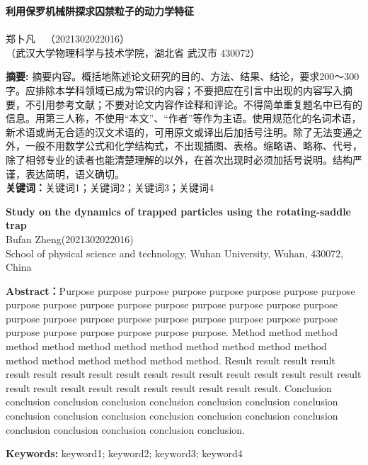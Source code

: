 \documentclass{WHUReport}
\newcommand{\name}{郑卜凡}
\newcommand{\stuid}{2021302022016}
\newcommand{\Name}{Bufan Zheng}
\newcommand{\newtitle}{利用保罗机械阱探求囚禁粒子的动力学特征}
\newcommand{\Title}{Study on the dynamics of trapped particles using the rotating-saddle trap}
\begin{document}
\pagestyle{maincontent} 


\begin{center}
 \textbf{\newtitle}\\
~\\
 \kaishu \name \ \ （\stuid）\\
 \kaishu （武汉大学物理科学与技术学院，湖北省 武汉市 430072）\\
\end{center}
\textbf{摘\quad 要:}
摘要内容。概括地陈述论文研究的目的、方法、结果、结论，要求200～300字。应排除本学科领域已成为常识的内容；不要把应在引言中出现的内容写入摘要，不引用参考文献；不要对论文内容作诠释和评论。不得简单重复题名中已有的信息。用第三人称，不使用“本文”、“作者”等作为主语。使用规范化的名词术语，新术语或尚无合适的汉文术语的，可用原文或译出后加括号注明。除了无法变通之外，一般不用数学公式和化学结构式，不出现插图、表格。缩略语、略称、代号，除了相邻专业的读者也能清楚理解的以外，在首次出现时必须加括号说明。结构严谨，表达简明，语义确切。\\
\textbf{关键词：}关键词1；关键词2；关键词3；关键词4
~\\
\begin{center}
	\textbf{\Title}\\
	 \Name\quad (\stuid)\\
	 School of physical science and technology, Wuhan University, Wuhan, 430072, China
\end{center}

\textbf{Abstract：}Purpose purpose purpose purpose purpose purpose purpose purpose purpose purpose purpose purpose purpose purpose purpose purpose purpose purpose purpose purpose purpose purpose purpose purpose purpose purpose purpose purpose purpose purpose purpose purpose. Method method method method method method method method method method method method method method method method method method. Result result result result result result result result result result result result result result result result result result result result result result result result result result result. Conclusion conclusion conclusion conclusion conclusion conclusion conclusion conclusion conclusion conclusion conclusion conclusion conclusion conclusion conclusion conclusion conclusion conclusion conclusion conclusion.

\textbf{Keywords: }keyword1; keyword2; keyword3; keyword4
\end{document}
